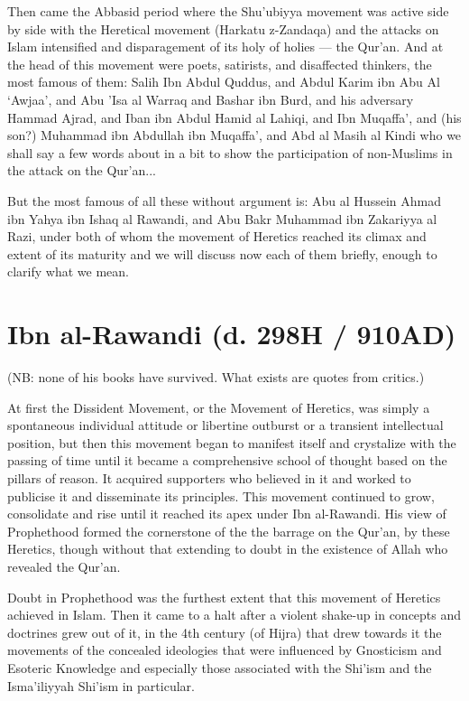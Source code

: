 \documentclass[12pt]{book}
\begin{document}
Then came the Abbasid period where the Shu’ubiyya movement was active side by
side with the Heretical movement (Harkatu z-Zandaqa) and the attacks on Islam
intensified and disparagement of its holy of holies — the Qur’an. And at the
head of this movement were poets, satirists, and disaffected thinkers, the most
famous of them: Salih Ibn Abdul Quddus, and Abdul Karim ibn Abu Al ‘Awjaa’, and
Abu ’Isa al Warraq and Bashar ibn Burd, and his adversary Hammad Ajrad, and
Iban ibn Abdul Hamid al Lahiqi, and Ibn Muqaffa’, and (his son?) Muhammad ibn
Abdullah ibn Muqaffa’, and Abd al Masih al Kindi who we shall say a few words
about in a bit to show the participation of non-Muslims in the attack on the
Qur’an...

But the most famous of all these without argument is: Abu al Hussein Ahmad ibn
Yahya ibn Ishaq al Rawandi, and Abu Bakr Muhammad ibn Zakariyya al Razi, under
both of whom the movement of Heretics reached its climax and extent of its
maturity and we will discuss now each of them briefly, enough to clarify what
we mean.


\section{Ibn al-Rawandi (d. 298H / 910AD)}

(NB: none of his books have survived. What exists are quotes from critics.)

At first the Dissident Movement, or the Movement of Heretics, was simply a
spontaneous individual attitude or libertine outburst or a transient
intellectual position, but then this movement began to manifest itself and
crystalize with the passing of time until it became a comprehensive school of
thought based on the pillars of reason. It acquired supporters who believed in
it and worked to publicise it and disseminate its principles. This movement
continued to grow, consolidate and rise until it reached its apex under Ibn
al-Rawandi. His view of Prophethood formed the cornerstone of the the barrage
on the Qur’an, by these Heretics, though without that extending to doubt in the
existence of Allah who revealed the Qur’an.

Doubt in Prophethood was the furthest extent that this movement of Heretics
achieved in Islam. Then it came to a halt after a violent shake-up in concepts
and doctrines grew out of it, in the 4th century (of Hijra) that drew towards
it the movements of the concealed ideologies that were influenced by Gnosticism
and Esoteric Knowledge and especially those associated with the Shi’ism and the
Isma’iliyyah Shi’ism in particular.
\end{document}
